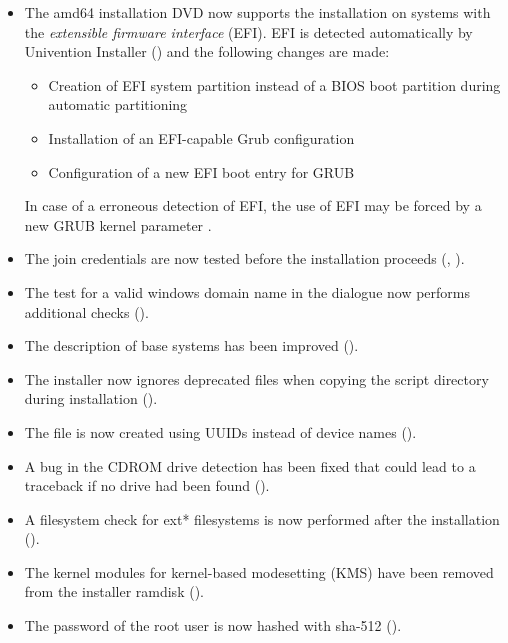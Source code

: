 \begin{itemize}
\begin{itemize}
  \end{itemize}

\item The amd64 installation DVD now supports the installation on
  systems with the \emph{extensible firmware interface} (EFI). EFI is
  detected automatically by Univention Installer () and
  the following changes are made:
  \begin{itemize}
  \item Creation of EFI system partition instead of a BIOS boot
    partition during automatic partitioning
  \item Installation of an EFI-capable Grub configuration
  \item Configuration of a new EFI boot entry for GRUB
  \end{itemize}
  In case of a erroneous detection of EFI, the use of EFI may be
  forced by a new GRUB kernel parameter .

\item The join credentials are now tested before the installation
  proceeds (, ).

\item The test for a valid windows domain name in the
   dialogue now performs additional
  checks ().

\item The description of base systems has been improved ().


\item The installer now ignores deprecated files when copying the script
directory during installation ().

\item The  file is now created using UUIDs instead
  of device names ().

\item A bug in the CDROM drive detection has been fixed that could lead to
  a traceback if no drive had been found ().

\item A filesystem check for ext* filesystems is now performed after
  the installation ().

\item The kernel modules for kernel-based modesetting (KMS) have been
  removed from the installer ramdisk ().

\item The password of the root user is now hashed with sha-512
  ().


\end{itemize}
